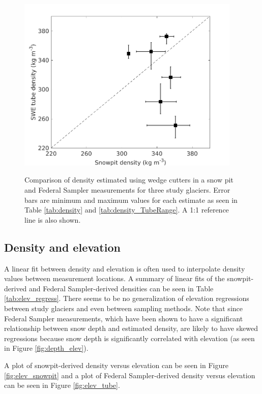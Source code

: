 \documentclass[12pt]{article}
\begin{document}
\begin{figure}[H]
	\centering
	\includegraphics[width =0.95\textwidth]{SnowpitVsSWEtube_all.png}\\
	\caption{Comparison of density estimated using wedge cutters in a snow pit and Federal Sampler measurements for three study glaciers. Error bars are minimum and maximum values for each estimate as seen in Table \ref{tab:density} and \ref{tab:density_TubeRange}. A 1:1 reference line is also shown.}
	\label{fig:density_pitVStube}
\end{figure}


\subsection{Density and elevation}

A linear fit between density and elevation is often used to interpolate density values between measurement locations. A summary of linear fits of the snowpit-derived and Federal Sampler-derived densities can be seen in Table \ref{tab:elev_regress}. There seems to be no generalization of elevation regressions between study glaciers and even between sampling methods. Note that since Federal Sampler measurements, which have been shown to have a significant relationship between snow depth and estimated density, are likely to have skewed regressions because snow depth is significantly correlated with elevation (as seen in Figure \ref{fig:depth_elev}). 

A plot of snowpit-derived density versus elevation can be seen in Figure \ref{fig:elev_snowpit} and a plot of Federal Sampler-derived density versus elevation can be seen in Figure \ref{fig:elev_tube}.
\end{document}
